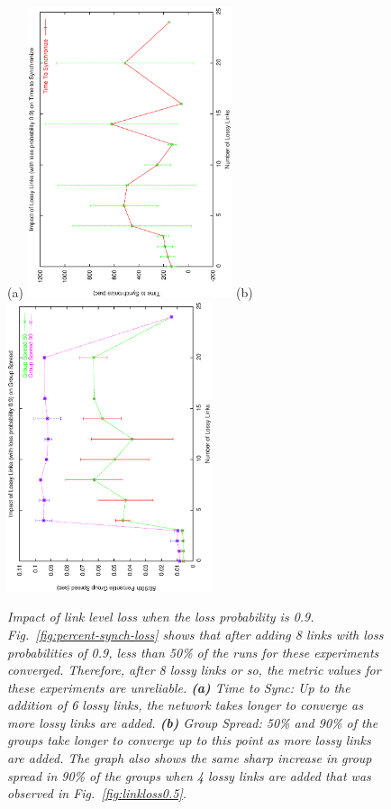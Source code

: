 \begin{figure}
\centerline{%
(a)
\includegraphics[width=6cm,angle=270]{figures/TTSvsLossyLinks0.9.ps}
(b)
\includegraphics[width=6cm,angle=270]{figures/GSvsLossyLinks0.9.ps}
}
\caption{ {\it Impact of link level loss when the loss probability is 0.9.  Fig.~\ref{fig:percent-synch-loss} shows that after adding 8 links with loss probabilities of 0.9, less than 50\% of the runs for these experiments converged.  Therefore, after 8 lossy links or so, the metric values for these experiments are unreliable. {\bf (a)} Time to Sync: Up to the addition of 6 lossy links, the network takes longer to converge as more lossy links are added. {\bf (b)} Group Spread: 50\% and 90\% of the groups take longer to converge up to this point as more lossy links are added. The graph also shows the same sharp increase in group spread in 90\% of the groups when 4 lossy links are added that was observed in Fig.~\ref{fig:linkloss0.5}.}}
\label{fig:linkloss0.9}
\end{figure}


